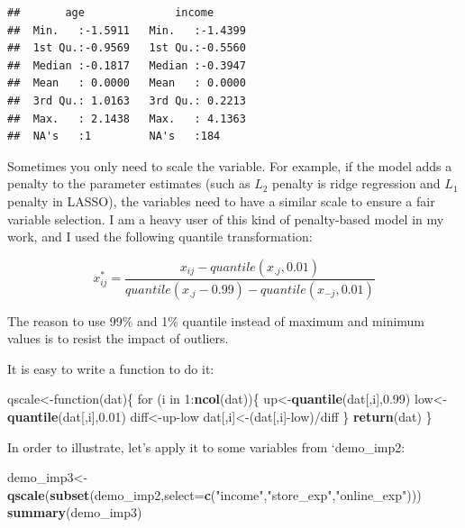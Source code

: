 \documentclass[12pt,]{krantz}
\newenvironment{Shaded}{\begin{snugshade}}{\end{snugshade}}
\newcommand{\KeywordTok}[1]{\textcolor[rgb]{0.13,0.29,0.53}{\textbf{{#1}}}}
\newcommand{\DataTypeTok}[1]{\textcolor[rgb]{0.13,0.29,0.53}{{#1}}}
\newcommand{\DecValTok}[1]{\textcolor[rgb]{0.00,0.00,0.81}{{#1}}}
\newcommand{\FloatTok}[1]{\textcolor[rgb]{0.00,0.00,0.81}{{#1}}}
\newcommand{\StringTok}[1]{\textcolor[rgb]{0.31,0.60,0.02}{{#1}}}
\newcommand{\NormalTok}[1]{{#1}}
\theoremstyle{definition}
\theoremstyle{definition}
\theoremstyle{remark}
\begin{document}
\begin{verbatim}
##       age              income       
##  Min.   :-1.5911   Min.   :-1.4399  
##  1st Qu.:-0.9569   1st Qu.:-0.5560  
##  Median :-0.1817   Median :-0.3947  
##  Mean   : 0.0000   Mean   : 0.0000  
##  3rd Qu.: 1.0163   3rd Qu.: 0.2213  
##  Max.   : 2.1438   Max.   : 4.1363  
##  NA's   :1         NA's   :184
\end{verbatim}

Sometimes you only need to scale the variable. For example, if the model
adds a penalty to the parameter estimates (such as \(L_2\) penalty is
ridge regression and \(L_1\) penalty in LASSO), the variables need to
have a similar scale to ensure a fair variable selection. I am a heavy
user of this kind of penalty-based model in my work, and I used the
following quantile transformation:

\[
x_{ij}^{*}=\frac{x_{ij}-quantile(x_{.j},0.01)}{quantile(x_{.j}-0.99)-quantile(x_{-j},0.01)}
\]

The reason to use 99\% and 1\% quantile instead of maximum and minimum
values is to resist the impact of outliers.

It is easy to write a function to do it:

\begin{Shaded}
\begin{Highlighting}[]
\NormalTok{qscale<-function(dat)\{}
  \NormalTok{for (i in }\DecValTok{1}\NormalTok{:}\KeywordTok{ncol}\NormalTok{(dat))\{}
    \NormalTok{up<-}\KeywordTok{quantile}\NormalTok{(dat[,i],}\FloatTok{0.99}\NormalTok{)}
    \NormalTok{low<-}\KeywordTok{quantile}\NormalTok{(dat[,i],}\FloatTok{0.01}\NormalTok{)}
    \NormalTok{diff<-up-low}
    \NormalTok{dat[,i]<-(dat[,i]-low)/diff}
  \NormalTok{\}}
  \KeywordTok{return}\NormalTok{(dat)}
\NormalTok{\}}
\end{Highlighting}
\end{Shaded}

In order to illustrate, let's apply it to some variables from
`demo\_imp2:

\begin{Shaded}
\begin{Highlighting}[]
\NormalTok{demo_imp3<-}\KeywordTok{qscale}\NormalTok{(}\KeywordTok{subset}\NormalTok{(demo_imp2,}\DataTypeTok{select=}\KeywordTok{c}\NormalTok{(}\StringTok{"income"}\NormalTok{,}\StringTok{"store_exp"}\NormalTok{,}\StringTok{"online_exp"}\NormalTok{)))}
\KeywordTok{summary}\NormalTok{(demo_imp3)}
\end{Highlighting}
\end{Shaded}
\end{document}
